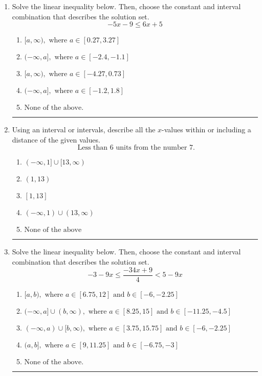 \documentclass[14pt]{extbook}
\newcommand{\litem}[1]{\item#1\hspace*{-1cm}\rule{\textwidth}{0.4pt}}
\begin{document}
\begin{enumerate}
{\begin{enumerate}[label=\Alph*.]
\end{enumerate} }
\litem{
Solve the linear inequality below. Then, choose the constant and interval combination that describes the solution set.\[ -5x -9 \leq 6x + 5 \]\begin{enumerate}[label=\Alph*.]
\item \( [a, \infty), \text{ where } a \in [0.27, 3.27] \)
\item \( (-\infty, a], \text{ where } a \in [-2.4, -1.1] \)
\item \( [a, \infty), \text{ where } a \in [-4.27, 0.73] \)
\item \( (-\infty, a], \text{ where } a \in [-1.2, 1.8] \)
\item \( \text{None of the above}. \)

\end{enumerate} }
\litem{
Using an interval or intervals, describe all the $x$-values within or including a distance of the given values.\[ \text{ Less than } 6 \text{ units from the number } 7. \]\begin{enumerate}[label=\Alph*.]
\item \( (-\infty, 1] \cup [13, \infty) \)
\item \( (1, 13) \)
\item \( [1, 13] \)
\item \( (-\infty, 1) \cup (13, \infty) \)
\item \( \text{None of the above} \)

\end{enumerate} }
\litem{
Solve the linear inequality below. Then, choose the constant and interval combination that describes the solution set.\[ -3 - 9 x \leq \frac{-34 x + 9}{4} < 5 - 9 x \]\begin{enumerate}[label=\Alph*.]
\item \( [a, b), \text{ where } a \in [6.75, 12] \text{ and } b \in [-6, -2.25] \)
\item \( (-\infty, a] \cup (b, \infty), \text{ where } a \in [8.25, 15] \text{ and } b \in [-11.25, -4.5] \)
\item \( (-\infty, a) \cup [b, \infty), \text{ where } a \in [3.75, 15.75] \text{ and } b \in [-6, -2.25] \)
\item \( (a, b], \text{ where } a \in [9, 11.25] \text{ and } b \in [-6.75, -3] \)
\item \( \text{None of the above.} \)


\end{enumerate}}
\end{enumerate}
\end{document}
